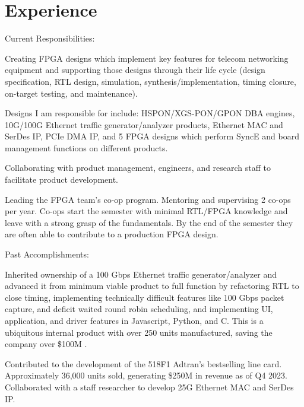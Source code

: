\documentclass[10pt]{deedy-resume-reversed}
\begin{document}
\begin{minipage}[t]{1.0\textwidth}
\section{Experience}
Current Responsibilities:
\vspace{\topsep} %
\begin{tightemize}
\item Creating FPGA designs which implement key features for telecom networking equipment and 
supporting those designs through their life cycle (design specification, RTL design, simulation, 
synthesis/implementation, timing closure, on-target testing, and maintenance).
\item Designs I am responsible for include: HSPON/XGS-PON/GPON DBA engines, 
10G/100G Ethernet traffic generator/analyzer products, 
Ethernet MAC and SerDes IP, PCIe DMA IP, and 5 FPGA designs which perform SyncE and board management functions on different products.
\item Collaborating with product management, engineers, and research staff to facilitate product development.
\item Leading the FPGA team's co-op program. Mentoring and supervising 2 co-ops per year. 
Co-ops start the semester with minimal RTL/FPGA knowledge and leave with a strong grasp of 
the fundamentals. By the end of the semester they are often able to contribute to a production FPGA design.
\end{tightemize}
Past Accomplishments:
\begin{tightemize}
\item Inherited ownership of a 100 Gbps Ethernet traffic generator/analyzer and advanced it from minimum viable product to full function by refactoring RTL to close timing, 
implementing technically difficult features like 100 Gbps packet capture, and deficit waited round robin scheduling, and implementing UI, application, 
and driver features in Javascript, Python, and C. This is a ubiquitous internal product with over 250 units manufactured, saving the company over \$100M .
\item Contributed to the development of the 518F1 Adtran’s bestselling line card. Approximately  36,000 units sold, generating \$250M in revenue as of Q4 2023. 
Collaborated with a staff researcher to develop 25G Ethernet MAC and SerDes IP.

\end{tightemize}
\end{minipage}
\end{document}
